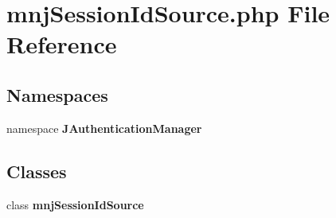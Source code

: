\section{mnjSessionIdSource.php File Reference}
\label{mnjSessionIdSource_8php}
\subsection*{Namespaces}
\begin{CompactItemize}
\item 
namespace {\bf JAuthenticationManager}
\end{CompactItemize}
\subsection*{Classes}
\begin{CompactItemize}
\item 
class {\bf mnjSessionIdSource}
\end{CompactItemize}
